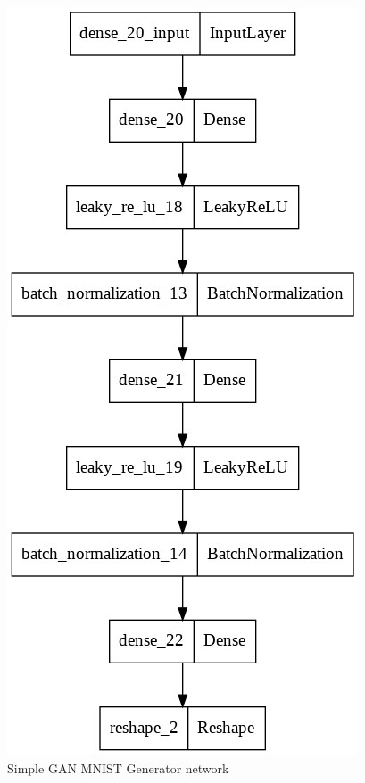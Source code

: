 \documentclass[conference]{IEEEtran}
\begin{document}
\begin{itemize}
    \begin{figure}[h]
    \centering
    \includegraphics[scale = 0.3]{dGAN_MNIST_gen_model.png}
      \caption{Simple GAN MNIST Generator network}
    \end{figure}
    

\end{itemize}
\end{document}
